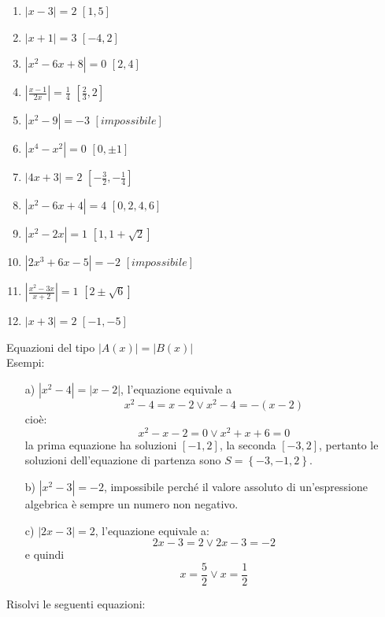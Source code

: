 \begin{enumerate}
        \item $|x-3|=2$ \hfill $\left[ 1, 5\right] $
        \item $|x+1|=3$ \hfill $\left[ -4, 2\right] $
        \item $|x^2-6x+8|=0$ \hfill $\left[ 2, 4\right] $
        \item $\left| \frac{x-1}{2x}\right| =\frac{1}{4}$ \hfill $\left[ 
\frac{2}{3}, 2\right] $
                \item $|x^2-9|=-3$ \hfill $\left[impossibile \right] $
                \item $|x^4-x^2|=0$ \hfill $\left[ 0, \pm 1\right] $
                \item $|4x+3|=2$ \hfill $\left[ -\frac{3}{2}, -\frac{1}{4} 
\right] $
                \item $|x^2-6x+4|=4$ \hfill $\left[ 0, 2, 4 , 6 \right] $
                \item $|x^2-2x|=1$ \hfill $\left[ 1, 1+\sqrt{2} \right] $
                \item $|2x^3+6x-5|=-2$ \hfill $\left[ impossibile \right] $
                \item $\left| \frac{x^2-3x}{x+2}\right| =1$ \hfill $\left[ 2\pm 
\sqrt{6} \right] $
                \item $|x+3|=2$ \hfill $\left[ -1, -5 \right] $
\end{enumerate}



Equazioni del tipo $|A(x)|=|B(x)|$\\
Esempi:
\begin{enumerate}
        \item[a)] $|x^2-4|=|x-2|$, l'equazione equivale a
        $$x^2-4=x-2 \vee x^2-4=-(x-2)$$
        cioè:
        $$x^2-x-2=0 \vee x^2+x+6=0$$la prima equazione ha soluzioni $[-1, 2]$, 
la seconda $[-3, 2]$, pertanto le soluzioni dell'equazione di partenza sono 
$S=\left\lbrace -3, -1, 2\right\rbrace $.
        
        \item[b)] $|x^2-3|=-2$, impossibile perché il valore assoluto di 
un'espressione algebrica è sempre un numero non negativo.
        \item[c)] $|2x-3|=2$, l'equazione equivale a:
        $$2x-3=2 \vee 2x-3=-2$$
        e quindi
        $$x=\frac{5}{2}\vee x=\frac{1}{2}$$
\end{enumerate}

Risolvi le seguenti equazioni:

